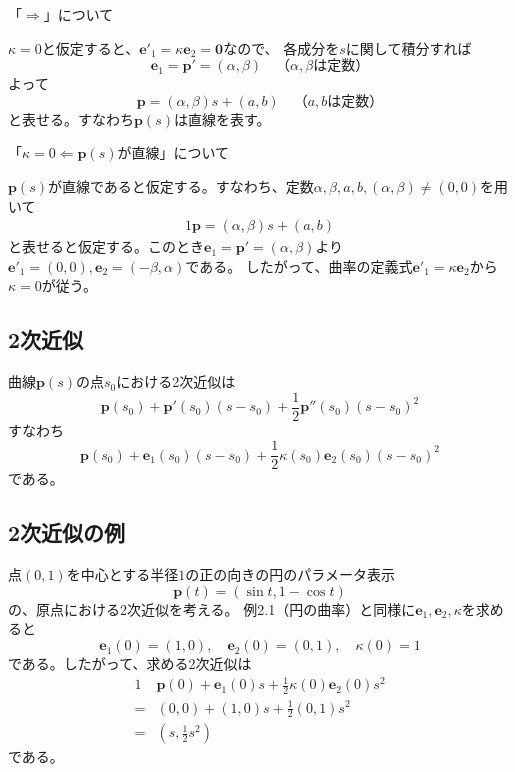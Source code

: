 \documentclass[a4j,disablejfam,dvipdfmx,papersize,slide,uplatex,21pt]{jsarticle}
\makeatletter
\renewenvironment{proof}[1][\proofname]{\par
        \pushQED{\qed}
        \normalfont
        \topsep6\p@\@plus6\p@ \trivlist
        \item[\hskip\labelsep{\bfseries #1}\@addpunct{\bfseries}]\ignorespaces
    }{%
        \popQED\endtrivlist\@endpefalse
    }
\renewcommand{\proofname}{証明.}
\makeatother
\begin{document}
\begin{proof}
    「$\Rightarrow$」について

    $\kappa = 0$と仮定すると、$\bm{e}'_1 = \kappa \bm{e}_2 = \bm{0}$なので、
    各成分を$s$に関して積分すれば
    \begin{equation}
        \bm{e}_1 = \bm{p}' = (\alpha, \beta) \quad \text{（$\alpha, \beta$は定数）}
    \end{equation}
    よって
    \begin{equation}
        \bm{p} = (\alpha, \beta) s + (a, b) \quad \text{（$a, b$は定数）}
    \end{equation}
    と表せる。すなわち$\bm{p}(s)$は直線を表す。

    \newpage

    「$\kappa = 0 \Leftarrow \text{$\bm{p}(s)$が直線}$」について

    $\bm{p}(s)$が直線であると仮定する。すなわち、定数$\alpha, \beta, a, b, (\alpha, \beta) \neq (0, 0)$を用いて
    \begin{alignat}{1}
        \bm{p} = (\alpha, \beta) s + (a, b)
    \end{alignat}
    と表せると仮定する。このとき$\bm{e}_1 = \bm{p}' = (\alpha, \beta)$より
    $\bm{e}'_1 = (0, 0), \bm{e}_2 = (-\beta, \alpha)$である。
    したがって、曲率の定義式$\bm{e}'_1 = \kappa \bm{e}_2$から
    $\kappa = 0$が従う。
\end{proof}

\newpage
\subsection*{2次近似}
曲線$\bm{p}(s)$の点$s_0$における2次近似は
\begin{equation}
    \bm{p}(s_0) + \bm{p}'(s_0) (s - s_0) + \frac{1}{2} \bm{p}''(s_0) (s - s_0)^2
\end{equation}
すなわち
\begin{equation}
    \bm{p}(s_0) + \bm{e}_1(s_0) (s - s_0) + \frac{1}{2} \kappa(s_0) \bm{e}_2(s_0) (s - s_0)^2
\end{equation}
である。

\newpage
\subsection*{2次近似の例}
点$(0, 1)$を中心とする半径$1$の正の向きの円のパラメータ表示
\begin{equation}
    \bm{p}(t) = \left(\sin t, 1 - \cos t\right)
\end{equation}
の、原点における2次近似を考える。
例2.1（円の曲率）と同様に$\bm{e}_1, \bm{e}_2, \kappa$を求めると
\begin{equation}
    \bm{e}_1(0) = (1, 0),\quad
    \bm{e}_2(0) = (0, 1),\quad
    \kappa(0) = 1
\end{equation}
である。したがって、求める2次近似は
\begin{alignat}{1}
      &\bm{p}(0) + \bm{e}_1(0) s + \frac{1}{2} \kappa(0) \bm{e}_2(0) s^2 \\
    = &(0, 0) + (1, 0) s + \frac{1}{2} (0, 1) s^2 \\
    = &\left(s, \frac{1}{2} s^2\right)
\end{alignat}
である。
\end{document}
